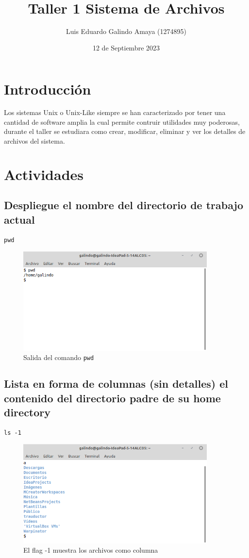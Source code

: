 \documentclass[11pt]{article}
\author{Luis Eduardo Galindo Amaya (1274895)}
\date{12 de Septiembre 2023}
\title{Taller 1 Sistema de Archivos}
\begin{document}
\tableofcontents\pagebreak
{}


\section{Introducción}
\label{sec:org0ee8b52}
Los sistemas Unix o Unix-Like siempre se han caracterizado por tener una 
cantidad de software amplia la cual permite contruir utilidades muy poderosas,
durante el taller se estudiara como crear, modificar, eliminar y ver los detalles
de archivos del sistema.   

\section{Actividades}
\label{sec:org865ee98}
\subsection{Despliegue el nombre del directorio de trabajo actual}
\label{sec:org76c2fcd}
\begin{verbatim}
pwd
\end{verbatim}

\begin{figure}[htbp]
\centering
\includegraphics[width=10cm]{img/1.png}
\caption[\texttt{pwd}]{Salida del comando \texttt{pwd}}
\end{figure}

\subsection{Lista en forma de columnas (sin detalles) el contenido del directorio padre de su home directory}
\label{sec:orgc7201d5}
\begin{verbatim}
ls -1
\end{verbatim}

\begin{figure}[htbp]
\centering
\includegraphics[width=10cm]{img/2.png}
\caption{El flag -1 muestra los archivos como columna}
\end{figure}
\end{document}
